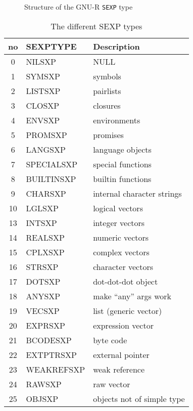 \begin{figure}
	\centering
  \caption{Structure of the GNU-R \texttt{SEXP} type}\label{fig:sexp-struct}
\end{figure}

\begin{table}[h!]
	\begin{tabular}{c l l}
		\textbf{no} & \textbf{SEXPTYPE} & \textbf{Description}       \\
		\hline
		0           & NILSXP            & NULL                       \\
		1           & SYMSXP            & symbols                    \\
		2           & LISTSXP           & pairlists                  \\
		3           & CLOSXP            & closures                   \\
		4           & ENVSXP            & environments               \\
		5           & PROMSXP           & promises                   \\
		6           & LANGSXP           & language objects           \\
		7           & SPECIALSXP        & special functions          \\
		8           & BUILTINSXP        & builtin functions          \\
		9           & CHARSXP           & internal character strings \\
		10          & LGLSXP            & logical vectors            \\
		13          & INTSXP            & integer vectors            \\
		14          & REALSXP           & numeric vectors            \\
		15          & CPLXSXP           & complex vectors            \\
		16          & STRSXP            & character vectors          \\
		17          & DOTSXP            & dot-dot-dot object         \\
		18          & ANYSXP            & make “any” args work       \\
		19          & VECSXP            & list (generic vector)      \\
		20          & EXPRSXP           & expression vector          \\
		21          & BCODESXP          & byte code                  \\
		22          & EXTPTRSXP         & external pointer           \\
		23          & WEAKREFSXP        & weak reference             \\
		24          & RAWSXP            & raw vector                 \\
		25          & OBJSXP            & objects not of simple type \\
	\end{tabular}
	\caption{The different SEXP types\cite[1.1.1 SEXPTYPEs]{rprojectInternals}}\label{tbl:sexptype}
\end{table}

